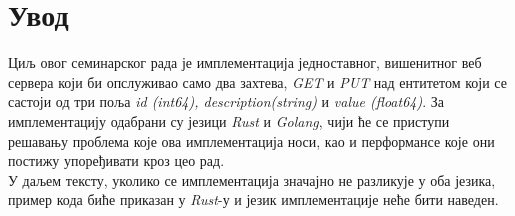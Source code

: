 \section{Увод}
Циљ овог семинарског рада је имплементација једноставног, вишенитног веб сервера који би опслуживао само два захтева, \textit{GET} и \textit{PUT} над  ентитетом који се састоји од три поља \textit{id (int64), description(string)} и \textit{value (float64)}. За имплементацију одабрани су језици \textit{Rust} и \textit{Golang}, чији ће се приступи решавању проблема које ова имплементација носи, као и перформансе које они постижу упоређивати кроз цео рад.\\

У даљем тексту, уколико се имплементација значајно не разликује у оба језика, пример кода биће приказан у \textit{Rust}-у и језик имплементације неће бити наведен.

